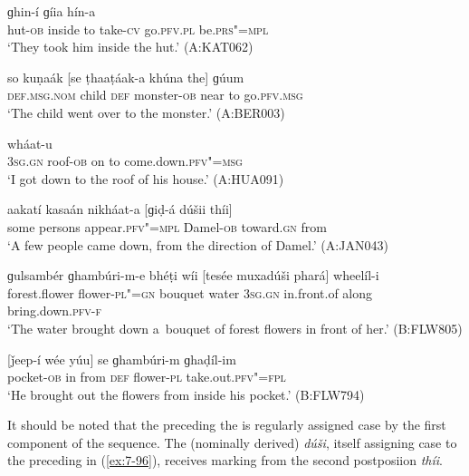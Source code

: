 \begin{exe}
\ex
\label{ex:7-93}
 ɡhin-í ɡíia hín-a \\
hut-\textsc{ob} inside to take-\textsc{cv} go.\textsc{pfv.pl} be.\textsc{prs"=mpl} \\
\glt `They took him inside the hut.' (A:KAT062)
\end{exe}
\begin{exe}
\ex
\label{ex:7-94}
\gll so kuṇaák [se ṭhaaṭáak-a khúna the] ɡúum \\
\textsc{def.msg.nom} child \textsc{def} monster-\textsc{ob} near to go.\textsc{pfv.msg} \\
\glt `The child went over to the monster.' (A:BER003)
\end{exe}
\begin{exe}
\ex
\label{ex:7-95}
 wháat-u \\
\textsc{3sg.gn} roof-\textsc{ob} on to come.down.\textsc{pfv"=msg}  \\
\glt `I got down to the roof of his house.' (A:HUA091)
\end{exe}
\begin{exe}
\ex
\label{ex:7-96}
\gll aakatí kasaán nikháat-a [ɡiḍ-á dúšii \textmd{thíi]} \\
some persons appear.\textsc{pfv"=mpl} Damel-\textsc{ob} toward.\textsc{gn} from \\
\glt `A few people came down, from the direction of Damel.' (A:JAN043)
\end{exe}
\begin{exe}
\ex
\label{ex:7-97}
\gll ɡulsambér ɡhambúri-m-e bhéṭi wíi [tesée muxadúši phará]
wheelíl-i \\
forest.flower flower-\textsc{pl"=gn} bouquet water \textsc{3sg.gn} in.front.of along bring.down.\textsc{pfv-f}\\
\glt `The water brought down a~bouquet of forest flowers in front of her.' (B:FLW805)
\end{exe}
\begin{exe}
\ex
\label{ex:7-98}
\gll \label{bkm:Ref193771773}[ǰeep-í wée yúu] se ɡhambúri-m ɡhaḍíl-im \\
pocket-\textsc{ob} in from \textsc{def} flower-\textsc{pl}  take.out.\textsc{pfv"=fpl} \\
\glt `He brought out the flowers from inside his pocket.' (B:FLW794)
\end{exe}

It should be noted that the  preceding the  is regularly assigned case by the first component of the sequence. The (nominally derived)  \textit{dúši}, itself assigning  case to the preceding  in (\ref{ex:7-96}), receives  marking from the second postposiion \textit{thíi}.


